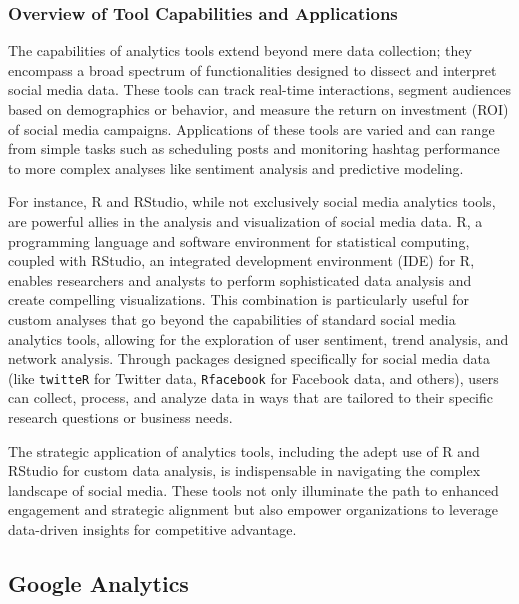 \documentclass[
]{book}
\begin{document}
\hypertarget{overview-of-tool-capabilities-and-applications}{%
\subsubsection*{Overview of Tool Capabilities and Applications}\label{overview-of-tool-capabilities-and-applications}}

The capabilities of analytics tools extend beyond mere data collection; they encompass a broad spectrum of functionalities designed to dissect and interpret social media data. These tools can track real-time interactions, segment audiences based on demographics or behavior, and measure the return on investment (ROI) of social media campaigns. Applications of these tools are varied and can range from simple tasks such as scheduling posts and monitoring hashtag performance to more complex analyses like sentiment analysis and predictive modeling.

For instance, R and RStudio, while not exclusively social media analytics tools, are powerful allies in the analysis and visualization of social media data. R, a programming language and software environment for statistical computing, coupled with RStudio, an integrated development environment (IDE) for R, enables researchers and analysts to perform sophisticated data analysis and create compelling visualizations. This combination is particularly useful for custom analyses that go beyond the capabilities of standard social media analytics tools, allowing for the exploration of user sentiment, trend analysis, and network analysis. Through packages designed specifically for social media data (like \texttt{twitteR} for Twitter data, \texttt{Rfacebook} for Facebook data, and others), users can collect, process, and analyze data in ways that are tailored to their specific research questions or business needs.

The strategic application of analytics tools, including the adept use of R and RStudio for custom data analysis, is indispensable in navigating the complex landscape of social media. These tools not only illuminate the path to enhanced engagement and strategic alignment but also empower organizations to leverage data-driven insights for competitive advantage.

\hypertarget{google-analytics}{%
\subsection*{Google Analytics}\label{google-analytics}}
\end{document}
